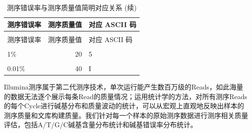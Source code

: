 \documentclass[
  a4paper,
  titlepage]{article}
\begin{document}
\begin{longtable}[t]{lrl}
\caption{\label{tab:err-details}测序错误率与测序质量值简明对应关系}\\
\toprule
测序错误率 & 测序质量值 & 对应 ASCII 码\\
\midrule
\endfirsthead
\caption[]{\label{tab:err-details}测序错误率与测序质量值简明对应关系 (续)}\\
\toprule
测序错误率 & 测序质量值 & 对应 ASCII 码\\
\midrule
\endhead
\hline
\endfoot
\bottomrule
\endlastfoot
\cellcolor{gray!6}{5\%} & \cellcolor{gray!6}{13} & \cellcolor{gray!6}{.}\\
 
1\% & 20 & 5\\
 
\cellcolor{gray!6}{0.1\%} & \cellcolor{gray!6}{30} & \cellcolor{gray!6}{?}\\
 
0.01\% & 40 & I\\*
\end{longtable}

Illumina测序属于第二代测序技术，单次运行能产生数百万级的Reads，如此海量的数据无法逐个展示每条Read的质量情况；运用统计学的方法，对所有测序Reads的每个Cycle进行碱基分布和质量波动的统计，可以从宏观上直观地反映出样本的测序质量和文库构建质量。我们针对每一个样本的原始测序数据进行测序相关质量评估，包括A/T/G/C碱基含量分布统计和碱基错误率分布统计。
\end{document}
